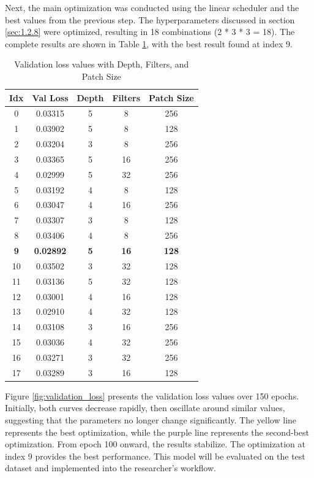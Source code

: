 \newpage
Next, the main optimization was conducted using the linear scheduler and the best values from the previous step. The hyperparameters discussed in section \ref{sec:1.2.8} were optimized, resulting in 18 combinations (2 * 3 * 3 = 18). The complete results are shown in Table \ref{tab:main_results}, with the best result found at index 9.

\begin{table}[H]
\centering
\renewcommand{\arraystretch}{1}
\begin{tabular}{|c|c|c|c|c|}
\hline
\textbf{Idx} & \textbf{Val Loss} & \textbf{Depth} & \textbf{Filters} & \textbf{Patch Size} \\
\hline
0  & 0.03315 & 5  & 8   & 256 \\
1  & 0.03902 & 5  & 8   & 128 \\
2  & 0.03204 & 3  & 8   & 256 \\
3  & 0.03365 & 5  & 16  & 256 \\
4  & 0.02999 & 5  & 32  & 256 \\
5  & 0.03192 & 4  & 8   & 128 \\
6  & 0.03047 & 4  & 16  & 256 \\
7  & 0.03307 & 3  & 8   & 128 \\
8  & 0.03406 & 4  & 8   & 256 \\
\textbf{9}  & \textbf{0.02892} & \textbf{5}  & \textbf{16}  & \textbf{128} \\
10 & 0.03502 & 3  & 32  & 128 \\
11 & 0.03136 & 5  & 32  & 128 \\
12 & 0.03001 & 4  & 16  & 128 \\
13 & 0.02910 & 4  & 32  & 128 \\
14 & 0.03108 & 3  & 16  & 256 \\
15 & 0.03036 & 4  & 32  & 256 \\
16 & 0.03271 & 3  & 32  & 256 \\
17 & 0.03289 & 3  & 16  & 128 \\
\hline
\end{tabular}
\caption{Validation loss values with Depth, Filters, and Patch Size}
\label{tab:main_results}
\end{table}

Figure \ref{fig:validation_loss} presents the validation loss values over 150 epochs. Initially, both curves decrease rapidly, then oscillate around similar values, suggesting that the parameters no longer change significantly. The yellow line represents the best optimization, while the purple line represents the second-best optimization. From epoch 100 onward, the results stabilize. The optimization at index 9 provides the best performance. This model will be evaluated on the test dataset and implemented into the researcher's workflow.

